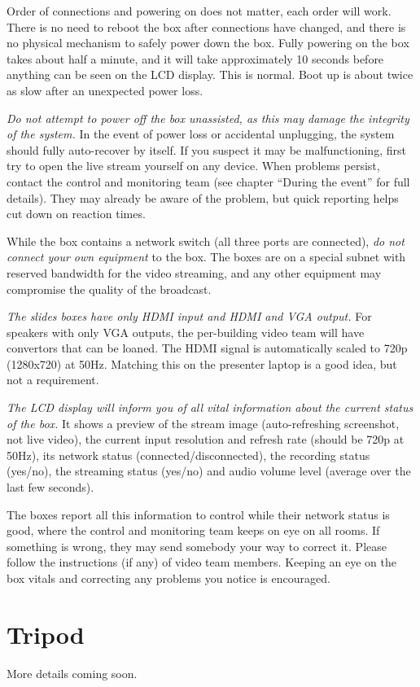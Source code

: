 \documentclass{article}
\begin{document}
Order of connections and powering on does not matter, each order will work. There is no need to reboot the box after connections have changed, and there is no physical mechanism to safely power down the box.
Fully powering on the box takes about half a minute, and it will take approximately 10 seconds before anything can be seen on the LCD display. This is normal. Boot up is about twice as slow after an unexpected power loss.

\emph{Do not attempt to power off the box unassisted, as this may damage the integrity of the system.}
In the event of power loss or accidental unplugging, the system should fully auto-recover by itself. If you suspect it may be malfunctioning, first try to open the live stream yourself on any device. When problems persist, contact the control and monitoring team (see chapter ``During the event'' for full details). They may already be aware of the problem, but quick reporting helps cut down on reaction times.

While the box contains a network switch (all three ports are connected), \emph{do not connect your own equipment} to the box. The boxes are on a special subnet with reserved bandwidth for the video streaming, and any other equipment may compromise the quality of the broadcast.

\emph{The slides boxes have only HDMI input and HDMI and VGA output.}
For speakers with only VGA outputs, the per-building video team will have convertors that can be loaned.
The HDMI signal is automatically scaled to 720p (1280x720) at 50Hz. Matching this on the presenter laptop is a good idea, but not a requirement.

\emph{The LCD display will inform you of all vital information about the current status of the box.} It shows a preview of the stream image (auto-refreshing screenshot, not live video), the current input resolution and refresh rate (should be 720p at 50Hz), its network status (connected/disconnected), the recording status (yes/no), the streaming status (yes/no) and audio volume level (average over the last few seconds).

The boxes report all this information to control while their network status is good, where the control and monitoring team keeps on eye on all rooms. If something is wrong, they may send somebody your way to correct it. Please follow the instructions (if any) of video team members. Keeping an eye on the box vitals and correcting any problems you notice is encouraged.

\section{Tripod}
More details coming soon.
\end{document}
